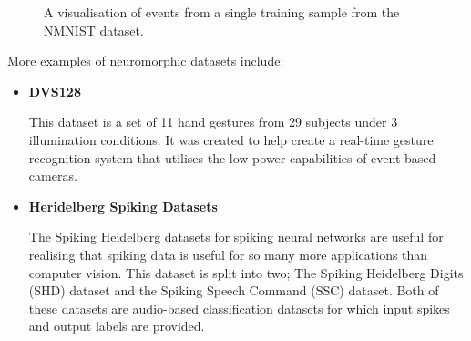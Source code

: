 \begin{figure}[htb]%
      \centering
      \qquad
      \caption{A visualisation of events from a single training sample from the NMNIST dataset.}%
      \label{fig:nmnist_spikes_visualisation}%
\end{figure}

More examples of neuromorphic datasets include:

\begin{itemize}
      \item \textbf{DVS128}

            This dataset is a set of 11 hand gestures from 29 subjects under 3 illumination conditions. It was created to help create a real-time gesture recognition system that utilises the low power capabilities of event-based cameras\cite{DVS128}.
      \item \textbf{Heridelberg Spiking Datasets}

            The Spiking Heidelberg datasets for spiking neural networks\cite{SpikingHeidelberg} are useful for realising that spiking data is useful for so many more applications than computer vision. This dataset is split into two; The Spiking Heidelberg Digits (SHD) dataset and the Spiking Speech Command (SSC) dataset. Both of these datasets are audio-based classification datasets for which input spikes and output labels are provided.
\end{itemize}


